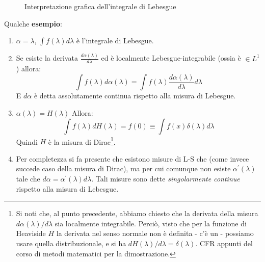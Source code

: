 \documentclass[FisicaTeorica.tex]{subfiles}
\begin{document}
\begin{figure}[H]

\caption{Interpretazione grafica dell'integrale di Lebesgue\label{fig:lebesgue}}
\end{figure}

Qualche \textbf{esempio}:
\begin{enumerate}
    \item $\alpha = \lambda$, $\int f\left(\lambda\right)d\lambda$ è l'integrale di Lebesgue.
	\item Se esiste la derivata $\frac{d\alpha\left(\lambda\right)}{d\lambda}$ ed è localmente Lebesgue-integrabile (ossia è $\in L^1$) allora:
	\begin{equation} \int f\left(\lambda\right)d\alpha\left(\lambda\right)=\int f\left(\lambda\right)\frac{d\alpha\left(\lambda\right)}{d\lambda} d\lambda 
	\label{eqn:cambio-di-misura}
	\end{equation}
	E $d\alpha$ è detta assolutamente continua rispetto alla misura di Lebesgue.
	\item $\alpha \left(\lambda\right)=H\left(\lambda\right)$ Allora:
	\[ \int f\left(\lambda\right)dH\left(\lambda\right)=f\left(0\right)\equiv \int f\left(x\right)\delta \left(\lambda\right)d\lambda \]
	Quindi $H$ è la misura di Dirac\footnote{Si noti che, al punto precedente, abbiamo chiesto che la derivata della misura $d\alpha(\lambda)/d\lambda$ sia localmente integrabile. Perciò, visto che per la funzione di Heaviside $H$ la derivata nel senso normale non è definita - c'è un  - possiamo usare quella distribuzionale, e si ha $dH(\lambda)/d\lambda=\delta(\lambda)$. CFR appunti del corso di metodi matematici per la dimostrazione.}.
	\item Per completezza si fa presente che esistono misure di L-S che  (come invece succede caso della misura di Dirac), ma per cui comunque non esiste $\alpha^\prime\left(\lambda\right)$ tale che $d\alpha=\alpha^\prime\left(\lambda\right)d\lambda$. Tali misure sono dette \emph{singolarmente continue} rispetto alla misura di Lebesgue.
\end{enumerate}
\end{document}
